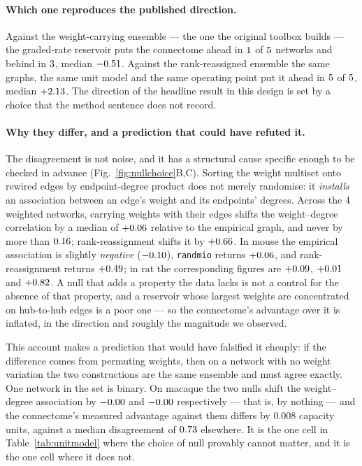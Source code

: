 \paragraph{Which one reproduces the published direction.}
Against the weight-carrying ensemble --- the one the original toolbox builds --- the
graded-rate reservoir puts the connectome ahead in $1$ of
$5$ networks and behind in $3$, median
$-0.51$. Against the rank-reassigned ensemble the same graphs, the same unit
model and the same operating point put it ahead in $5$ of
$5$, median $+2.13$. The direction of the headline result in
this design is set by a choice that the method sentence does not record.

\paragraph{Why they differ, and a prediction that could have refuted it.}
The disagreement is not noise, and it has a structural cause specific enough to be
checked in advance (Fig.~\ref{fig:nullchoice}B,C). Sorting the weight multiset onto rewired edges by endpoint-degree
product does not merely randomise: it \emph{installs} an association between an edge's
weight and its endpoints' degrees. Across the $4$ weighted networks,
carrying weights with their edges shifts the weight--degree correlation by a median of
$+0.06$ relative to the empirical graph, and never by more than
$0.16$; rank-reassignment shifts it by $+0.66$. In mouse the
empirical association is slightly \emph{negative} ($-0.10$), \texttt{randmio}
returns $+0.06$, and rank-reassignment returns $+0.49$; in rat the
corresponding figures are $+0.09$, $+0.01$ and $+0.82$. A null that
adds a property the data lacks is not a control for the absence of that property, and a
reservoir whose largest weights are concentrated on hub-to-hub edges is a poor one --- so
the connectome's advantage over it is inflated, in the direction and roughly the
magnitude we observed.

This account makes a prediction that would have falsified it cheaply: if the difference
comes from permuting weights, then on a network with no weight variation the two
constructions are the same ensemble and must agree exactly. One network in the set is
binary. On macaque the two nulls shift the weight--degree association by
$-0.00$ and $-0.00$ respectively --- that is, by nothing --- and
the connectome's measured advantage against them differs by $0.008$ capacity units,
against a median disagreement of $0.73$ elsewhere. It is the one cell in
Table~\ref{tab:unitmodel} where the choice of null provably cannot matter, and it is the
one cell where it does not.

